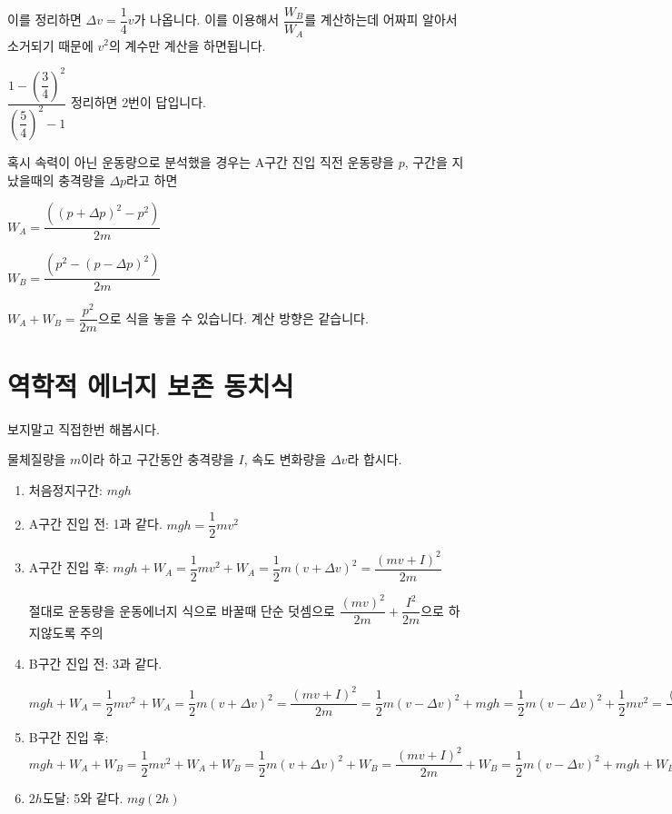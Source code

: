 \documentclass{oblivoir}
\begin{document}
이를 정리하면 $\Delta v =\dfrac{1}{4}v$가 나옵니다. 이를 이용해서 $\dfrac{W_B}{W_A}$를 계산하는데 어짜피 알아서 소거되기 때문에 $v^2$의 계수만 계산을 하면됩니다. \par $\dfrac{1-\left(\dfrac{3}{4}\right)^2}{\left(\dfrac{5}{4}\right)^2-1}$ 정리하면 2번이 답입니다.
\par \par \par \par
혹시 속력이 아닌 운동량으로 분석했을 경우는 A구간 진입 직전 운동량을 $p$, 구간을 지났을때의 충격량을 $\Delta p$라고 하면\par $W_A=\dfrac{((p+\Delta p)^2-p^2)}{2m}$ \par $W_B = \dfrac{(p^2-(p-\Delta p)^2)}{2m}$ \par
$W_A + W_B = \dfrac{p^2}{2m}$으로 식을 놓을 수 있습니다. 계산 방향은 같습니다. 

\newpage

\section{역학적 에너지 보존 동치식}

보지말고 직접한번 해봅시다.


물체질량을 $m$이라 하고 구간동안 충격량을 $I$, 속도 변화량을 $\Delta v$라 합시다.
\begin{enumerate}
    \item 처음정지구간: $mgh$
    \item A구간 진입 전: 1과 같다. $mgh = \dfrac{1}{2}mv^2$
    \item  A구간 진입 후: $mgh + W_A  =\dfrac{1}{2}mv^2 + W_A = \dfrac{1}{2}m(v+\Delta v)^2 = \dfrac{(mv + I)^2}{2m}$ 
    \begin{justbox}
    절대로 운동량을 운동에너지 식으로 바꿀때 단순 덧셈으로
    $\dfrac{(mv)^2}{2m}+\dfrac{I^2}{2m}$으로 하지않도록 주의 
    \end{justbox}
    \item  B구간 진입 전: 3과 같다.
    
    $mgh + W_A  =\dfrac{1}{2}mv^2 + W_A = \dfrac{1}{2}m(v+\Delta v)^2 = \dfrac{(mv + I)^2}{2m} = \dfrac{1}{2}m(v-\Delta v)^2 + mgh = \dfrac{1}{2}m(v-\Delta v)^2 + \dfrac{1}{2}mv^2= \dfrac{(mv - I)^2}{2m} +mgh$
    \item B구간 진입 후:   $mgh + W_A + W_B = \dfrac{1}{2}mv^2 + W_A + W_B = \dfrac{1}{2}m(v+\Delta v)^2 + W_B = \dfrac{(mv + I)^2}{2m} + W_B = \dfrac{1}{2}m(v-\Delta v)^2 + mgh + W_B = \dfrac{1}{2}m(v-\Delta v)^2 + \dfrac{1}{2}mv^2 + W_B = \dfrac{(mv - I)^2}{2m} + mgh + W_B = \dfrac{1}{2}mv^2 + mgh $
    \item $2h$도달: 5와 같다. $mg(2h)$
\end{enumerate}
\end{document}
